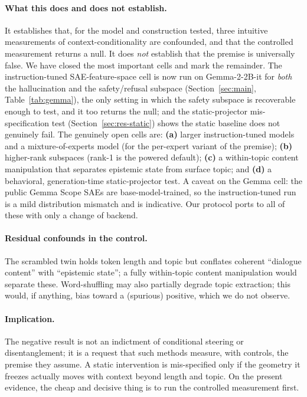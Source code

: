 \documentclass{article}
\begin{document}
\paragraph{What this does and does not establish.} It establishes that, for the model and
construction tested, three intuitive measurements of context-conditionality are
confounded, and that the controlled measurement returns a null. It does \emph{not}
establish that the premise is universally false. We have closed the most important cells and
mark the remainder. The instruction-tuned SAE-feature-space cell is now run on Gemma-2-2B-it for
\emph{both} the hallucination and the safety/refusal subspace (Section~\ref{sec:main},
Table~\ref{tab:gemma}), the only setting in which the safety subspace is recoverable enough to
test, and it too returns the null; and the static-projector mis-specification test
(Section~\ref{sec:res-static}) shows the static baseline does not genuinely fail. The genuinely
open cells are: \textbf{(a)} larger instruction-tuned models and a mixture-of-experts model (for
the per-expert variant of the premise); \textbf{(b)} higher-rank subspaces (rank-1 is the powered
default); \textbf{(c)} a within-topic content manipulation that separates epistemic state from
surface topic; and \textbf{(d)} a behavioral, generation-time static-projector test. A caveat on
the Gemma cell: the public Gemma Scope SAEs are base-model-trained, so the instruction-tuned run
is a mild distribution mismatch and is indicative. Our protocol ports to all of these with only a
change of backend.

\paragraph{Residual confounds in the control.} The scrambled twin holds token length and
topic but conflates coherent ``dialogue content'' with ``epistemic state''; a fully
within-topic content manipulation would separate these. Word-shuffling may also partially
degrade topic extraction; this would, if anything, bias toward a (spurious) positive,
which we do not observe.

\paragraph{Implication.} The negative result is not an indictment of conditional steering
or disentanglement; it is a request that such methods measure, with controls, the premise
they assume. A static intervention is mis-specified only if the geometry it freezes
actually moves with context beyond length and topic. On the present evidence, the cheap
and decisive thing is to run the controlled measurement first.
\end{document}
